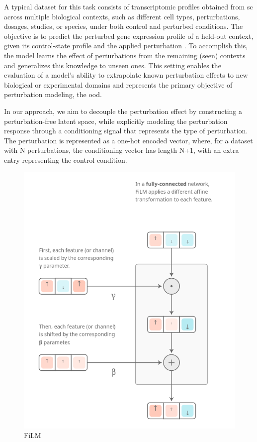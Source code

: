 \documentclass[12pt, a4paper]{article}
\begin{document}
A typical dataset for this task consists of transcriptomic profiles obtained from \gls{sc} across multiple biological contexts, such as different cell types, perturbations, dosages, studies, or species, under both control and perturbed conditions. The objective is to predict the perturbed gene expression profile of a held-out context, given its control-state profile and the applied perturbation .
To accomplish this, the model learns the effect of perturbations from the remaining (seen) contexts and generalizes this knowledge to unseen ones. This setting enables the evaluation of a model's ability to extrapolate known perturbation effects to new biological or experimental domains and represents the primary objective of perturbation modeling, the \gls{ood}.



In our approach, we aim to decouple the perturbation effect by constructing a perturbation-free latent space, while explicitly modeling the perturbation response through a conditioning signal that represents the type of perturbation.
The perturbation is represented as a one-hot encoded vector, where, for a dataset with N perturbations, the conditioning vector has length N+1, with an extra entry representing the control condition.


\begin{figure}
  \begin{center}
    \includegraphics[width=.4\textwidth]{film_layers.png}
  \end{center}
  \caption{FiLM \cite{dumoulin2018feature-wise}}
\end{figure}
\end{document}
